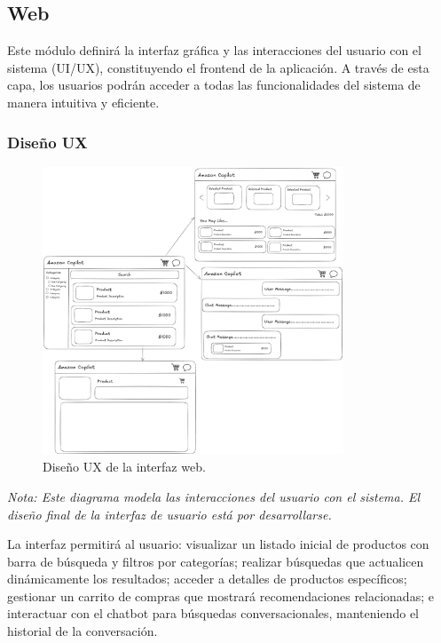 \documentclass[12pt]{article}
\begin{document}
\subsection{Web}

Este módulo definirá la interfaz gráfica y las interacciones del usuario con el sistema (UI/UX), constituyendo el frontend de la aplicación. A través de esta capa, los usuarios podrán acceder a todas las funcionalidades del sistema de manera intuitiva y eficiente.

\subsubsection{Diseño UX}

\begin{figure}[H]
    \centering
    \includegraphics[width=0.8\textwidth]{ux.png}
    \caption{Diseño UX de la interfaz web.}
    \label{fig:ux_design}
\end{figure}

\noindent \textit{Nota: Este diagrama modela las interacciones del usuario con el sistema. El diseño final de la interfaz de usuario está por desarrollarse.}

\vspace{0.75cm}

La interfaz permitirá al usuario: visualizar un listado inicial de productos con barra de búsqueda y filtros por categorías; realizar búsquedas que actualicen dinámicamente los resultados; acceder a detalles de productos específicos; gestionar un carrito de compras que mostrará recomendaciones relacionadas; e interactuar con el chatbot para búsquedas conversacionales, manteniendo el historial de la conversación.
\end{document}
